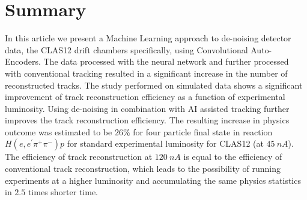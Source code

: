 

\section{Summary}

In this article we present a Machine Learning approach to de-noising detector data, the CLAS12 drift chambers specifically, using Convolutional Auto-Encoders. The data processed with the neural network and further processed with conventional tracking resulted in a significant increase in the number of reconstructed tracks. The study performed on simulated data shows a significant improvement of track reconstruction efficiency as a function of experimental luminosity. Using de-noising in combination with AI assisted tracking further improves the track reconstruction efficiency. The resulting increase in physics outcome was estimated to be $26\%$ for four particle final state in reaction $H(e,e^\prime\pi^+\pi^-)p$ for standard experimental luminosity for CLAS12 (at $45~nA$). The efficiency of track reconstruction at $120~nA$ is equal to the efficiency of conventional track reconstruction, which leads to the possibility of running experiments at a higher luminosity and accumulating the same physics statistics in $2.5$ times shorter time.
